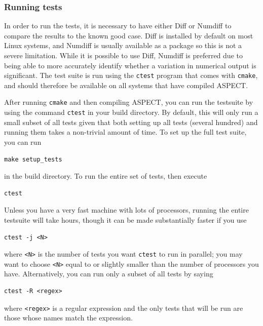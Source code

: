 \documentclass{article}
\newcommand{\aspect}{\textsc{ASPECT}}
\begin{document}
\subsubsection{Running tests}
\label{sec:running_tests}

In order to run the tests, it is necessary to have either Diff or Numdiff to
compare the results to the known good case.
Diff is installed by default on most Linux systems, and Numdiff is usually
available as a package so this is not a severe limitation.
While it is possible to use Diff, Numdiff is preferred due to being able to
more accurately identify whether a variation in numerical output is
significant.
The test suite is run using the \texttt{ctest} program that comes with
\texttt{cmake}, and should therefore be available on all systems that have
compiled \aspect{}.

After running \texttt{cmake} and then compiling \aspect{}, you can run the
testsuite by using the command \texttt{ctest} in your build directory. By default, this will only run a small
subset of all tests given that both setting up all tests (several hundred) and
running them takes a non-trivial amount of time. To set up the full test suite,
you can run
\begin{lstlisting}[frame=single,language=ksh]
    make setup_tests
\end{lstlisting}
 in the build directory. To run the entire set of tests, then execute
\begin{lstlisting}[frame=single,language=ksh]
    ctest
\end{lstlisting}
Unless you have a very fast machine with lots of processors, running the entire
testsuite will take hours, though it can be made substantially faster if you use
\begin{lstlisting}[frame=single,language=ksh]
    ctest -j <N>
\end{lstlisting}
where \texttt{<N>} is the number of tests you want \texttt{ctest} to run
in parallel; you may want to choose \texttt{<N>} equal to or slightly smaller
than the number of processors you have. Alternatively, you can run only a subset
of all tests by saying 
\begin{lstlisting}[frame=single,language=ksh] 
    ctest -R <regex>
\end{lstlisting}
where \texttt{<regex>} is a regular expression and the only tests that will be
run are those whose names match the expression.
\end{document}
